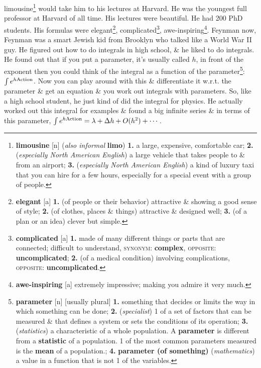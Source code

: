 \documentclass[oneside]{book}
\numberwithin{equation}{section}
\begin{document}
limousine\footnote{\textbf{limousine} [n] (\textit{also informal} \textbf{limo}) \textbf{1.} a large, expensive, comfortable car; \textbf{2.} (\textit{especially North American English}) a large vehicle that takes people to \& from an airport; \textbf{3.} (\textit{especially North American English}) a kind of luxury taxi that you can hire for a few hours, especially for a special event with a group of people.} would take him to his lectures at Harvard. He was the youngest full professor at Harvard of all time. His lectures were beautiful. He had 200 PhD students. His formulas were elegant\footnote{\textbf{elegant} [a] \textbf{1.} (of people or their behavior) attractive \& showing a good sense of style; \textbf{2.} (of clothes, places \& things) attractive \& designed well; \textbf{3.} (of a plan or an idea) clever but simple.}, complicated\footnote{\textbf{complicated} [a] \textbf{1.} made of many different things or parts that are connected; difficult to understand, \textsc{synonym}: \textbf{complex}, \textsc{opposite}: \textbf{uncomplicated}; \textbf{2.} (of a medical condition) involving complications, \textsc{opposite}: \textbf{uncomplicated}.}, awe-inspiring\footnote{\textbf{awe-inspiring} [a] extremely impressive; making you admire it very much.}. Feynman now, Feynman was a smart Jewish kid from Brooklyn who talked like a World War II guy. He figured out how to do integrals in high school, \& he liked to do integrals. He found out that if you put a parameter, it's usually called $h$, in front of the exponent then you could think of the integral as a function of the parameter\footnote{\textbf{parameter} [n] [usually plural] \textbf{1.} something that decides or limits the way in which something can be done; \textbf{2.} (\textit{specialist}) 1 of a set of factors that can be measured \& that defines a system or sets the conditions of its operation; \textbf{3.} (\textit{statistics}) a characteristic of a whole population. A \textbf{parameter} is different from a \textbf{statistic} of a population. 1 of the most common parameters measured is the \textbf{mean} of a population.; \textbf{4.} \textbf{parameter (of something)} (\textit{mathematics}) a value in a function that is not 1 of the variables.}: $\int e^{h{\rm Action}}$. Now you can play around with this \& differentiate it w.r.t. the parameter \& get an equation \& you work out integrals with parameters. So, like a high school student, he just kind of did the integral for physics. He actually worked out this integral for examples \& found a big infinite series \& in terms of this parameter, $\int e^{h{\rm Action}} = \lambda + \Delta h + O(h^2) + \cdots$.
\end{document}
